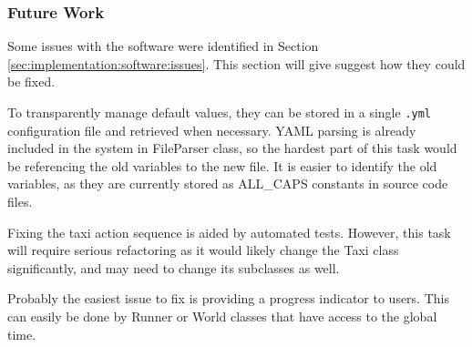 \subsubsection{Future Work}

Some issues with the software were identified in Section
\ref{sec:implementation:software:issues}. This section will give suggest how
they could be fixed.

To transparently manage default values, they can be stored in a single
\texttt{.yml} configuration file and retrieved when necessary. YAML parsing is
already included in the system in FileParser class, so the hardest part of this
task would be referencing the old variables to the new file. It is easier to
identify the old variables, as they are currently stored as ALL\_CAPS constants
in source code files.

Fixing the taxi action sequence is aided by automated tests. However, this task
will require serious refactoring as it would likely change the Taxi class
significantly, and may need to change its subclasses as well.

Probably the easiest issue to fix is providing a progress indicator to users.
This can easily be done by Runner or World classes that have access to the
global time.
